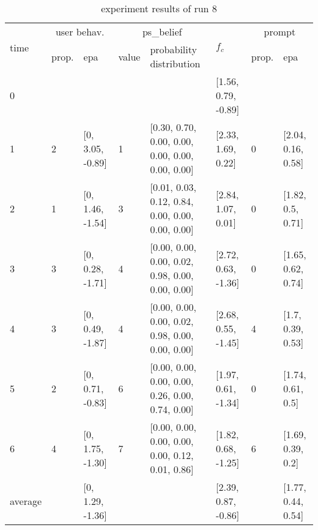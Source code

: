 \begin{table}[htbp]\footnotesize
\caption{experiment results of run 8}
\begin{center}
\begin{tabular}{|p{0.4cm}|p{0.6cm}|l|p{0.6cm}|p{3.3cm}|l|p{0.6cm}|l|}
\hline

\multirow{2}{*}{time} & \multicolumn{2}{c|}{user behav.} & \multicolumn{2}{c|}{ps\_belief} &
\multirow{2}{*}{$f_c$} & \multicolumn{2}{c|}{prompt} \\ \cline{2-5}\cline{ 7- 8}
& prop. & epa & value & probability distribution &  & prop. & epa \\ \hline

0 & \multicolumn{1}{l|}{} &  & \multicolumn{1}{l|}{} &  & [1.56, 0.79, -0.89] & \multicolumn{1}{l|}{} &  \\ \hline
1 & 2 & [0, 3.05, -0.89] & 1 & [0.30, 0.70, 0.00, 0.00, 0.00, 0.00, 0.00, 0.00] & [2.33, 1.69, 0.22] & 0 & [2.04, 0.16, 0.58] \\ \hline
2 & 1 & [0, 1.46, -1.54] & 3 & [0.01, 0.03, 0.12, 0.84, 0.00, 0.00, 0.00, 0.00] & [2.84, 1.07, 0.01] & 0 & [1.82, 0.5, 0.71] \\ \hline
3 & 3 & [0, 0.28, -1.71] & 4 & [0.00, 0.00, 0.00, 0.02, 0.98, 0.00, 0.00, 0.00] & [2.72, 0.63, -1.36] & 0 & [1.65, 0.62, 0.74] \\ \hline
4 & 3 & [0, 0.49, -1.87] & 4 & [0.00, 0.00, 0.00, 0.02, 0.98, 0.00, 0.00, 0.00] & [2.68, 0.55, -1.45] & 4 & [1.7, 0.39, 0.53] \\ \hline
5 & 2 & [0, 0.71, -0.83] & 6 & [0.00, 0.00, 0.00, 0.00, 0.26, 0.00, 0.74, 0.00] & [1.97, 0.61, -1.34] & 0 & [1.74, 0.61, 0.5] \\ \hline
6 & 4 & [0, 1.75, -1.30] & 7 & [0.00, 0.00, 0.00, 0.00, 0.00, 0.12, 0.01, 0.86] & [1.82, 0.68, -1.25] & 6 & [1.69, 0.39, 0.2] \\ \hline
\multicolumn{1}{|l|}{average} & \multicolumn{1}{l|}{} & [0, 1.29, -1.36] & \multicolumn{1}{l|}{} &  & [2.39, 0.87, -0.86] & \multicolumn{1}{l|}{} & [1.77, 0.44, 0.54] \\ \hline
\end{tabular}
\end{center}
\label{}
\end{table}


